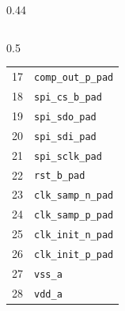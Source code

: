 \begin{frame}
\begin{columns}[t]
\begin{column}{0.44\textwidth}
\begin{columns}[t,onlytextwidth]
\begin{column}{0.5\textwidth}
\begin{tabular}{r|l}
            17 & \texttt{comp\_out\_p\_pad} \\
            18 & \texttt{spi\_cs\_b\_pad} \\
            19 & \texttt{spi\_sdo\_pad} \\
            20 & \texttt{spi\_sdi\_pad} \\
            21 & \texttt{spi\_sclk\_pad} \\
            22 & \texttt{rst\_b\_pad} \\
            23 & \texttt{clk\_samp\_n\_pad} \\
            24 & \texttt{clk\_samp\_p\_pad} \\
            25 & \texttt{clk\_init\_n\_pad} \\
            26 & \texttt{clk\_init\_p\_pad} \\
            27 & \texttt{vss\_a} \\
            28 & \texttt{vdd\_a} \\
          \end{tabular}
        \end{column}
      \end{columns}
    \end{column}
  \end{columns}
\end{frame}

